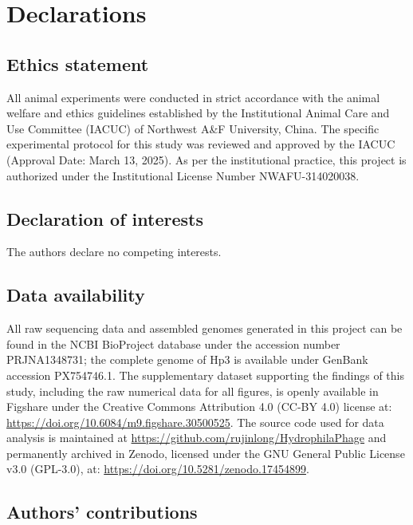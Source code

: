 \documentclass[11pt,a4paper]{article}
\begin{document}
\section{Declarations}\label{declarations}

\subsection{Ethics statement}\label{ethics-statement}

All animal experiments were conducted in strict accordance with the
animal welfare and ethics guidelines established by the Institutional
Animal Care and Use Committee (IACUC) of Northwest A\&F University,
China. The specific experimental protocol for this study was reviewed
and approved by the IACUC (Approval Date: March 13, 2025). As per the
institutional practice, this project is authorized under the
Institutional License Number NWAFU-314020038.

\subsection{Declaration of interests}\label{competing-interests}

The authors declare no competing interests.

\subsection{Data availability}\label{data-availability}

All raw sequencing data and assembled genomes generated in this project
can be found in the NCBI BioProject database under the accession number
PRJNA1348731; the complete genome of Hp3 is available under GenBank
accession PX754746.1. The supplementary dataset supporting the findings of this
study, including the raw numerical data for all figures, is openly
available in Figshare under the Creative Commons Attribution 4.0 (CC-BY
4.0) license at: \url{https://doi.org/10.6084/m9.figshare.30500525}. The
source code used for data analysis is maintained at
\url{https://github.com/rujinlong/HydrophilaPhage} and permanently
archived in Zenodo, licensed under the GNU General Public License v3.0
(GPL-3.0), at: \url{https://doi.org/10.5281/zenodo.17454899}.

\subsection{Authors' contributions}\label{authors-contributions}
\end{document}
